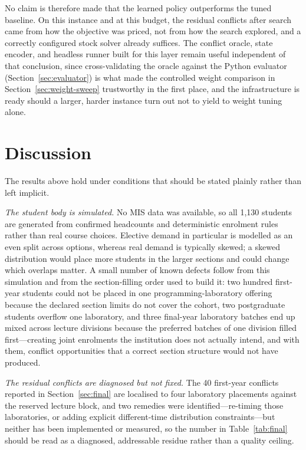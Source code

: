 \documentclass[journal]{IEEEtran}
\begin{document}
No claim is therefore made that the learned policy outperforms the tuned baseline. On this instance and at this budget, the residual conflicts after search came from how the objective was priced, not from how the search explored, and a correctly configured stock solver already suffices. The conflict oracle, state encoder, and headless runner built for this layer remain useful independent of that conclusion, since cross-validating the oracle against the Python evaluator (Section~\ref{sec:evaluator}) is what made the controlled weight comparison in Section~\ref{sec:weight-sweep} trustworthy in the first place, and the infrastructure is ready should a larger, harder instance turn out not to yield to weight tuning alone.

\section{Discussion}
\label{sec:discussion}

The results above hold under conditions that should be stated plainly rather than left implicit.

\emph{The student body is simulated.} No MIS data was available, so all 1{,}130 students are generated from confirmed headcounts and deterministic enrolment rules rather than real course choices. Elective demand in particular is modelled as an even split across options, whereas real demand is typically skewed; a skewed distribution would place more students in the larger sections and could change which overlaps matter. A small number of known defects follow from this simulation and from the section-filling order used to build it: two hundred first-year students could not be placed in one programming-laboratory offering because the declared section limits do not cover the cohort, two postgraduate students overflow one laboratory, and three final-year laboratory batches end up mixed across lecture divisions because the preferred batches of one division filled first---creating joint enrolments the institution does not actually intend, and with them, conflict opportunities that a correct section structure would not have produced.

\emph{The residual conflicts are diagnosed but not fixed.} The 40 first-year conflicts reported in Section~\ref{sec:final} are localised to four laboratory placements against the reserved lecture block, and two remedies were identified---re-timing those laboratories, or adding explicit different-time distribution constraints---but neither has been implemented or measured, so the number in Table~\ref{tab:final} should be read as a diagnosed, addressable residue rather than a quality ceiling.
\end{document}
